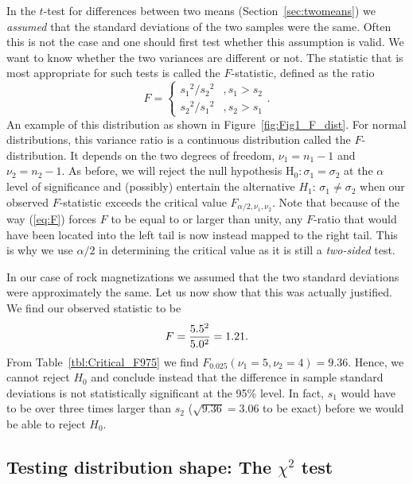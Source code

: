 	In the $t$-test for differences between two means (Section~\ref{sec:twomeans})
we \emph{assumed} that the standard deviations of the two samples were the same.
Often this is not the case  and one should first test whether this 
assumption is valid.  We want to know whether the two variances are different or not.  The 
statistic that is most appropriate for such tests is called the $F$-statistic, defined as the ratio
\begin{equation}
F=\left \{ \begin{array}{cc}{s_1}^2/{s_2}^2 & ,s_1>s_2\\
{s_2}^2/{s_1}^2 & ,s_2>s_1
\end{array}\right..
\label{eq:F}
\end{equation}
An example of this distribution as shown in Figure~\ref{fig:Fig1_F_dist}.
For normal distributions, this variance ratio is a continuous distribution called the $F$-distribution.  
It depends on the two degrees of freedom, $\nu_1 = n_1 - 1$ and $\nu_2 = n_2 - 1$.  As before, we will reject 
the null hypothesis H$_0:\sigma_1 = \sigma_2$ at the $\alpha$ level of significance and (possibly) entertain the alternative 
$H_1$: $\sigma_1 \neq \sigma_2$  when our observed $F$-statistic exceeds the critical value $F_{\alpha/2,\nu_1,\nu_2}$.
Note that because of the way (\ref{eq:F}) forces $F$ to be equal to or larger than unity, any $F$-ratio that would
have been located into the left tail is now instead mapped to the right tail.  This is why we use $\alpha/2$ in determining
the critical value as it is still a \emph{two-sided} test.
\begin{example}
In our case of rock magnetizations we assumed that the two standard deviations were approximately 
the same.  Let us now show that this was actually justified.  We find our observed statistic to be
\begin{equation}
	\index{\emph{F}-test}
	\index{F-test}
	\index{Test!\emph{F}}
F=\frac{5.5^2}{5.0^2}=1.21.
\end{equation}	 
From Table~\ref{tbl:Critical_F975} we find $F_{0.025}(\nu_1 = 5, \nu _2 = 4) = 9.36$. Hence, we cannot reject $H_0$ and conclude instead
that the difference in sample standard deviations is not statistically significant at the 95\% level.  In fact, $s_1$ would
have to be over three times larger than $s_2$ ($\sqrt{9.36} = 3.06$ to be exact) before we would be able to reject $H_0$.
\end{example}

\subsection{Testing distribution shape: The $\chi^2$ test}

